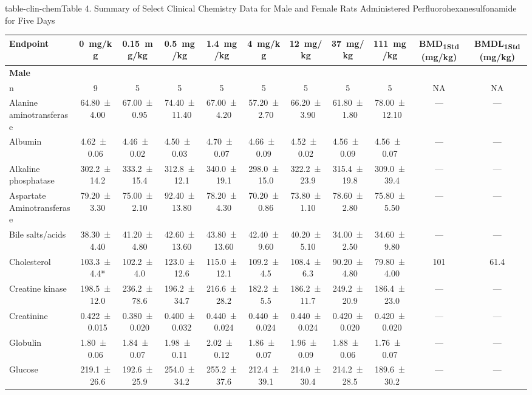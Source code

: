 \begin{landscape}
\begin{niehstable}{table-clin-chem}{Table 4. Summary of Select Clinical Chemistry Data for Male and Female Rats Administered Perfluorohexanesulfonamide for Five Days}
\begin{tabular}{lcccccccccc}
\toprule
Endpoint & 0~mg/kg & 0.15~mg/kg & 0.5~mg/kg & 1.4~mg/kg & 4~mg/kg & 12~mg/kg & 37~mg/kg & 111~mg/kg & BMD\textsubscript{1Std} (mg/kg) & BMDL\textsubscript{1Std} (mg/kg) \\
\midrule
\multicolumn{11}{l}{\textbf{Male}} \\
n & 9 & 5 & 5 & 5 & 5 & 5 & 5 & 5 & NA & NA \\
Alanine aminotransferase & 64.80 ± 4.00 & 67.00 ± 0.95 & 74.40 ± 11.40 & 67.00 ± 4.20 & 57.20 ± 2.70 & 66.20 ± 3.90 & 61.80 ± 1.80 & 78.00 ± 12.10 & — & — \\
Albumin & 4.62 ± 0.06 & 4.46 ± 0.02 & 4.50 ± 0.03 & 4.70 ± 0.07 & 4.66 ± 0.09 & 4.52 ± 0.02 & 4.56 ± 0.09 & 4.56 ± 0.07 & — & — \\
Alkaline phosphatase & 302.2 ± 14.2 & 333.2 ± 15.4 & 312.8 ± 12.1 & 340.0 ± 19.1 & 298.0 ± 15.0 & 322.2 ± 23.9 & 315.4 ± 19.8 & 309.0 ± 39.4 & — & — \\
Aspartate Aminotransferase & 79.20 ± 3.30 & 75.00 ± 2.10 & 92.40 ± 13.80 & 78.20 ± 4.30 & 70.20 ± 0.86 & 73.80 ± 1.10 & 78.60 ± 2.80 & 75.80 ± 5.50 & — & — \\
Bile salts/acids & 38.30 ± 4.40 & 41.20 ± 4.80 & 42.60 ± 13.60 & 43.80 ± 13.60 & 42.40 ± 9.60 & 40.20 ± 5.10 & 34.00 ± 2.50 & 34.60 ± 9.80 & — & — \\
Cholesterol & 103.3 ± 4.4* & 102.2 ± 4.0 & 123.0 ± 12.6 & 115.0 ± 12.1 & 109.2 ± 4.5 & 108.4 ± 6.3 & 90.20 ± 4.80 & 79.80 ± 4.00 & 101 & 61.4 \\
Creatine kinase & 198.5 ± 12.0 & 236.2 ± 78.6 & 196.2 ± 34.7 & 216.6 ± 28.2 & 182.2 ± 5.5 & 186.2 ± 11.7 & 249.2 ± 20.9 & 186.4 ± 23.0 & — & — \\
Creatinine & 0.422 ± 0.015 & 0.380 ± 0.020 & 0.400 ± 0.032 & 0.440 ± 0.024 & 0.440 ± 0.024 & 0.440 ± 0.024 & 0.420 ± 0.020 & 0.420 ± 0.020 & — & — \\
Globulin & 1.80 ± 0.06 & 1.84 ± 0.07 & 1.98 ± 0.11 & 2.02 ± 0.12 & 1.86 ± 0.07 & 1.96 ± 0.09 & 1.88 ± 0.06 & 1.76 ± 0.07 & — & — \\
Glucose & 219.1 ± 26.6 & 192.6 ± 25.9 & 254.0 ± 34.2 & 255.2 ± 37.6 & 212.4 ± 39.1 & 214.0 ± 30.4 & 214.2 ± 28.5 & 189.6 ± 30.2 & — & — \\

\end{tabular}
\end{niehstable}
\end{landscape}
